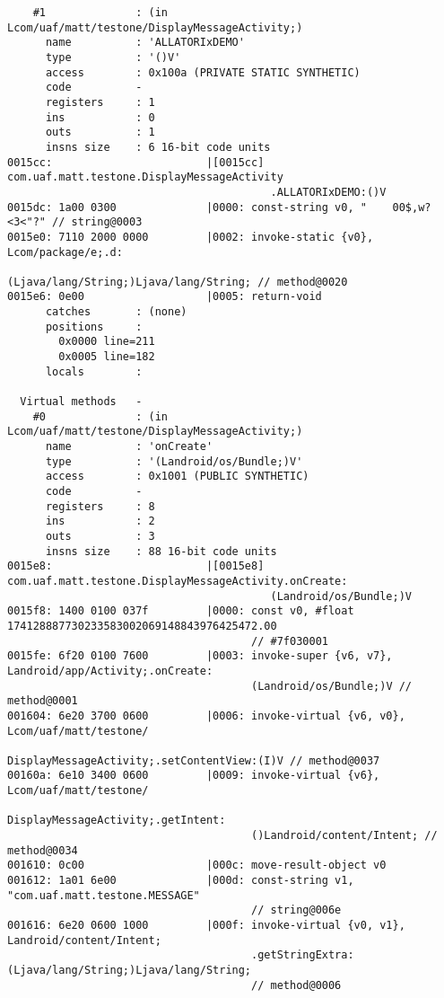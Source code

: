 \begin{lstlisting}
    #1              : (in Lcom/uaf/matt/testone/DisplayMessageActivity;)
      name          : 'ALLATORIxDEMO'
      type          : '()V'
      access        : 0x100a (PRIVATE STATIC SYNTHETIC)
      code          -
      registers     : 1
      ins           : 0
      outs          : 1
      insns size    : 6 16-bit code units
0015cc:                        |[0015cc] com.uaf.matt.testone.DisplayMessageActivity
                                         .ALLATORIxDEMO:()V
0015dc: 1a00 0300              |0000: const-string v0, "	00$,w?<3<"?" // string@0003
0015e0: 7110 2000 0000         |0002: invoke-static {v0}, Lcom/package/e;.d:
                                      (Ljava/lang/String;)Ljava/lang/String; // method@0020
0015e6: 0e00                   |0005: return-void
      catches       : (none)
      positions     :
        0x0000 line=211
        0x0005 line=182
      locals        :

  Virtual methods   -
    #0              : (in Lcom/uaf/matt/testone/DisplayMessageActivity;)
      name          : 'onCreate'
      type          : '(Landroid/os/Bundle;)V'
      access        : 0x1001 (PUBLIC SYNTHETIC)
      code          -
      registers     : 8
      ins           : 2
      outs          : 3
      insns size    : 88 16-bit code units
0015e8:                        |[0015e8] com.uaf.matt.testone.DisplayMessageActivity.onCreate:
                                         (Landroid/os/Bundle;)V
0015f8: 1400 0100 037f         |0000: const v0, #float 174128887730233583002069148843976425472.00
                                      // #7f030001
0015fe: 6f20 0100 7600         |0003: invoke-super {v6, v7}, Landroid/app/Activity;.onCreate:
                                      (Landroid/os/Bundle;)V // method@0001
001604: 6e20 3700 0600         |0006: invoke-virtual {v6, v0}, Lcom/uaf/matt/testone/
                                      DisplayMessageActivity;.setContentView:(I)V // method@0037
00160a: 6e10 3400 0600         |0009: invoke-virtual {v6}, Lcom/uaf/matt/testone/
                                      DisplayMessageActivity;.getIntent:
                                      ()Landroid/content/Intent; // method@0034
001610: 0c00                   |000c: move-result-object v0
001612: 1a01 6e00              |000d: const-string v1, "com.uaf.matt.testone.MESSAGE"
                                      // string@006e
001616: 6e20 0600 1000         |000f: invoke-virtual {v0, v1}, Landroid/content/Intent;
                                      .getStringExtra:(Ljava/lang/String;)Ljava/lang/String;
                                      // method@0006







\end{lstlisting}
